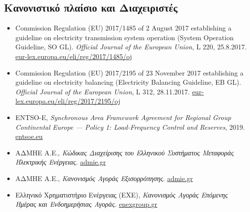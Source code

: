 \subsection*{Κανονιστικό πλαίσιο και Διαχειριστές}

\begin{itemize}
\item Commission Regulation (EU) 2017/1485 of 2 August 2017 establishing a guideline on
      electricity transmission system operation (System Operation Guideline, SO GL).
      \textit{Official Journal of the European Union}, L 220, 25.8.2017.
      \href{https://eur-lex.europa.eu/eli/reg/2017/1485/oj}{eur-lex.europa.eu/eli/reg/2017/1485/oj}
\item Commission Regulation (EU) 2017/2195 of 23 November 2017 establishing a guideline on
      electricity balancing (Electricity Balancing Guideline, EB GL). \textit{Official Journal
      of the European Union}, L 312, 28.11.2017.
      \href{https://eur-lex.europa.eu/eli/reg/2017/2195/oj}{eur-lex.europa.eu/eli/reg/2017/2195/oj}
\item ENTSO-E, \textit{Synchronous Area Framework Agreement for Regional Group Continental
      Europe --- Policy 1: Load-Frequency Control and Reserves}, 2019.
      \href{https://www.entsoe.eu/}{entsoe.eu}
\item ΑΔΜΗΕ Α.Ε., \textit{Κώδικας Διαχείρισης του Ελληνικού Συστήματος Μεταφοράς Ηλεκτρικής
      Ενέργειας}. \href{https://www.admie.gr/}{admie.gr}
\item ΑΔΜΗΕ Α.Ε., \textit{Κανονισμός Αγοράς Εξισορρόπησης}. \href{https://www.admie.gr/}{admie.gr}
\item Ελληνικό Χρηματιστήριο Ενέργειας (ΕΧΕ), \textit{Κανονισμός Αγοράς Επόμενης Ημέρας και
      Ενδοημερήσιας Αγοράς}. \href{https://www.enexgroup.gr/}{enexgroup.gr}
\end{itemize}
